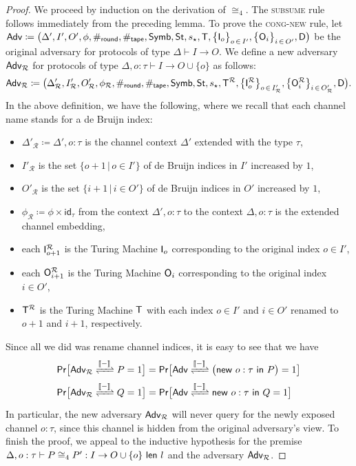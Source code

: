 \begin{proof}
We proceed by induction on the derivation of $\cong_4$. The \textsc{subsume} rule follows immediately from the preceding lemma. To prove the \textsc{cong-new} rule, let $\Adv \coloneqq \big(\Delta', I', O', \phi, \#_\round, \#_\tape, \Symb, \St, s_\star, \Step, \big\{\In_o\big\}_{o \, \in \, I'}, \big\{\Out_i\big\}_{i \, \in \, O'}, \Dec\big)$ be the original adversary for protocols of type $\Delta \vdash I \to O$. We define a new adversary $\Adv_\mathcal{R}$ for protocols of type $\Delta, o : \tau \vdash I \to O \cup \{o\}$ as follows:
\[\Adv_\mathcal{R} \coloneqq \big(\Delta'_\mathcal{R}, I'_\mathcal{R}, O'_\mathcal{R}, \phi_\mathcal{R}, \#_\round, \#_\tape, \Symb, \St, s_\star, \Step^\mathcal{R}, \big\{\In^\mathcal{R}_o\big\}_{o \, \in \, I'_\mathcal{R}}, \big\{\Out^\mathcal{R}_i\big\}_{i \, \in \, O'_\mathcal{R}}, \Dec\big).\]
In the above definition, we have the following, where we recall that each channel name stands for a de Bruijn index:
\begin{itemize}
\item $\Delta'_\mathcal{R} \coloneqq \Delta', o:\tau$ is the channel context $\Delta'$ extended with the type $\tau$,
\item $I'_\mathcal{R}$ is the set $\{o + 1 \, | \, o \in I'\}$ of de Bruijn indices in $I'$ increased by $1$,
\item $O'_\mathcal{R}$ is the set $\{i + 1 \, | \, i \in O'\}$ of de Bruijn indices in $O'$ increased by $1$,
\item $\phi_\mathcal{R} \coloneqq \phi \times \mathsf{id}_\tau$ from the context $\Delta',o:\tau$ to the context $\Delta,o:\tau$ is the extended channel embedding,
\item each $\In^\mathcal{R}_{o+1}$ is the Turing Machine $\In_o$ corresponding to the original index $o \in I'$,
\item each $\Out^\mathcal{R}_{i+1}$ is the Turing Machine $\Out_i$ corresponding to the original index $i \in O'$,
\item $\Step^\mathcal{R}$ is the Turing Machine $\Step$ with each index $o \in I'$ and $i \in O'$ renamed to $o+1$ and $i+1$, respectively.
\end{itemize}
Since all we did was rename channel indices, it is easy to see that we have
\begin{align*}
& \mathsf{Pr}\big[\interaction{\Adv_\mathcal{R}}{P}{\int{-}} = 1\big] = \mathsf{Pr}\big[\interaction{\Adv}{\big(\new{o}{\tau}{P}\big)}{\int{-}} = 1\big] \\
& \mathsf{Pr}\big[\interaction{\Adv_\mathcal{R}}{Q}{\int{-}} = 1\big] = \mathsf{Pr}\big[\interaction{\Adv}{\new{o}{\tau}{Q}}{\int{-}} = 1\big]
\end{align*}
In particular, the new adversary $\Adv_\mathcal{R}$ will never query for the newly exposed channel $o:\tau$, since this channel is hidden from the original adversary's view. To finish the proof, we appeal to the inductive hypothesis for the premise $\Delta, o : \tau \vdash \lapproxcong{P}{P'}{I}{O \cup \{o\}}{l}{4}$ and the adversary $\Adv_\mathcal{R}$.
\end{proof}

